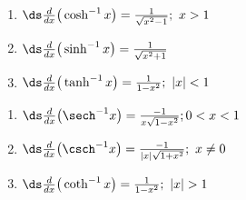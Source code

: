\setboxwidth{120pt}
\noindent\begin{minipage}{\specialboxlength}
{%
\begin{minipage}[t]{.45\specialboxlength}
\begin{enumerate}
\item $\ds\frac{d}{dx}\big(\cosh^{-1} x\big) = \frac{1}{\sqrt{x^2-1}};\ x>1$
\item $\ds\frac{d}{dx}\big(\sinh^{-1} x\big) = \frac{1}{\sqrt{x^2+1}}$
\item $\ds\frac{d}{dx}\big(\tanh^{-1} x\big) = \frac{1}{1-x^2};\ |x|<1$
\end{enumerate}
\end{minipage}
\begin{minipage}[t]{.55\specialboxlength}
\begin{enumerate}\addtocounter{enumi}{3}
\item $\ds\frac{d}{dx}\big(\sech^{-1} x\big) = \frac{-1}{x\sqrt{1-x^2}}; 0<x<1$
\item $\ds\frac{d}{dx}\big(\csch^{-1} x\big) = \frac{-1}{|x|\sqrt{1+x^2}};\ x\neq0$
\item $\ds\frac{d}{dx}\big(\coth^{-1} x\big) = \frac{1}{1-x^2};\ |x|>1$
\end{enumerate}
\end{minipage}
}
\end{minipage}
\restoreboxwidth
\\

